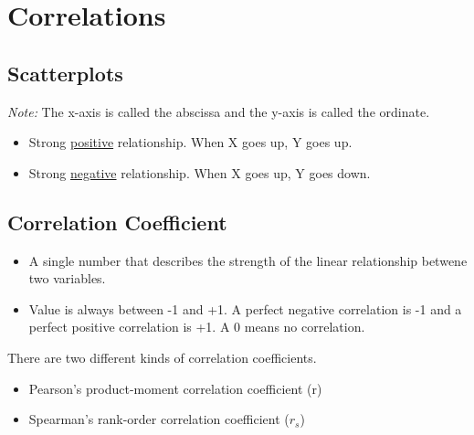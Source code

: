 \documentclass[11pt]{report}
\begin{document}
\section{Correlations}
\subsection{Scatterplots}
\textit{Note:} The x-axis is called the abscissa and the y-axis is called the ordinate. \newline 
\begin{itemize}
    \item Strong \underline{positive} relationship. When X goes up, Y goes up.
    \item Strong \underline{negative} relationship. When X goes up, Y goes down.
\end{itemize}

\subsection{Correlation Coefficient}
\begin{itemize}
    \item A single number that describes the strength of the linear relationship betwene two variables. 
    \item Value is always between -1 and +1. A perfect negative correlation is -1 and a perfect positive correlation is +1. A 0 means no correlation.
\end{itemize}

There are two different kinds of correlation coefficients. 
\begin{itemize}
    \item Pearson's product-moment correlation coefficient (r)
    \item Spearman's rank-order correlation coefficient ($r_s$)
\end{itemize}
\end{document}
